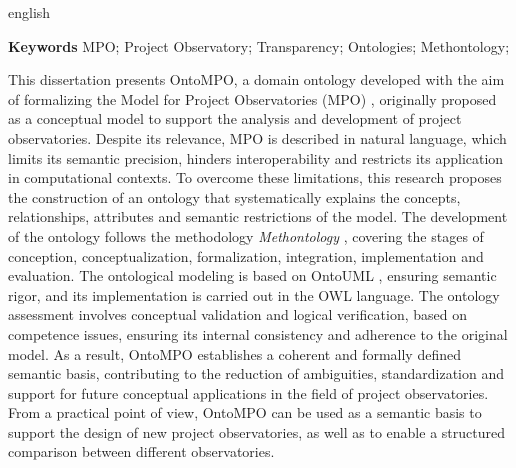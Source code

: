 \begin{resumo}[Abstract]
 \begin{otherlanguage*}{english}
   
\textbf{Keywords}
   \vspace{\onelineskip}
     MPO;
     Project Observatory;
     Transparency;
     Ontologies;
     Methontology;
   \noindent 
 \end{otherlanguage*}

This dissertation presents OntoMPO, a domain ontology developed with the aim of formalizing the Model for Project Observatories (MPO) \cite{vieira2022thesis}, originally proposed as a conceptual model to support the analysis and development of project observatories. Despite its relevance, MPO is described in natural language, which limits its semantic precision, hinders interoperability and restricts its application in computational contexts. To overcome these limitations, this research proposes the construction of an ontology that systematically explains the concepts, relationships, attributes and semantic restrictions of the model. The development of the ontology follows the methodology \textit{Methontology} \cite{fernandez1997methontology}, covering the stages of conception, conceptualization, formalization, integration, implementation and evaluation. The ontological modeling is based on OntoUML \cite{ontouml_readthedocs}, ensuring semantic rigor, and its implementation is carried out in the OWL language. The ontology assessment involves conceptual validation and logical verification, based on competence issues, ensuring its internal consistency and adherence to the original model. As a result, OntoMPO establishes a coherent and formally defined semantic basis, contributing to the reduction of ambiguities, standardization and support for future conceptual applications in the field of project observatories. From a practical point of view, OntoMPO can be used as a semantic basis to support the design of new project observatories, as well as to enable a structured comparison between different observatories.
 
\end{resumo}


